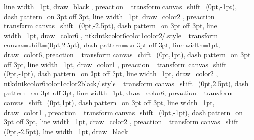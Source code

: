 {{{      line width=1pt,
      draw=black
      },
    preaction={
      transform canvas={shift={(0pt,-1pt)}},
      dash pattern=on 3pt off 3pt,
      line width=1pt,
      draw=color2
      },
    preaction={
      transform canvas={shift={(0pt,-2.5pt)}},
      dash pattern=on 3pt off 3pt,
      line width=1pt,
      draw=color6
      }  
    },
     ntkdntkcolor6color1color2/.style={
    transform canvas={shift={(0pt,2.5pt)}},
    dash pattern=on 3pt off 3pt,
    line width=1pt,
    draw=color6,
    preaction={
      transform canvas={shift={(0pt,1pt)}},
      dash pattern=on 3pt off 3pt,
      line width=1pt,
      draw=color1
      },
    preaction={
      transform canvas={shift={(0pt,-1pt)}},
      dash pattern=on 3pt off 3pt,
      line width=1pt,
      draw=color2
      }  
    },
    ntkdntkcolor6color1color2black/.style={
    transform canvas={shift={(0pt,2.5pt)}},
    dash pattern=on 3pt off 3pt,
    line width=1pt,
    draw=color6,
    preaction={
      transform canvas={shift={(0pt,1pt)}},
      dash pattern=on 3pt off 3pt,
      line width=1pt,
      draw=color1
      },
    preaction={
      transform canvas={shift={(0pt,-1pt)}},
      dash pattern=on 3pt off 3pt,
      line width=1pt,
      draw=color2
      },
    preaction={
      transform canvas={shift={(0pt,-2.5pt)}},
      line width=1pt,
      draw=black
      }
    }
}

